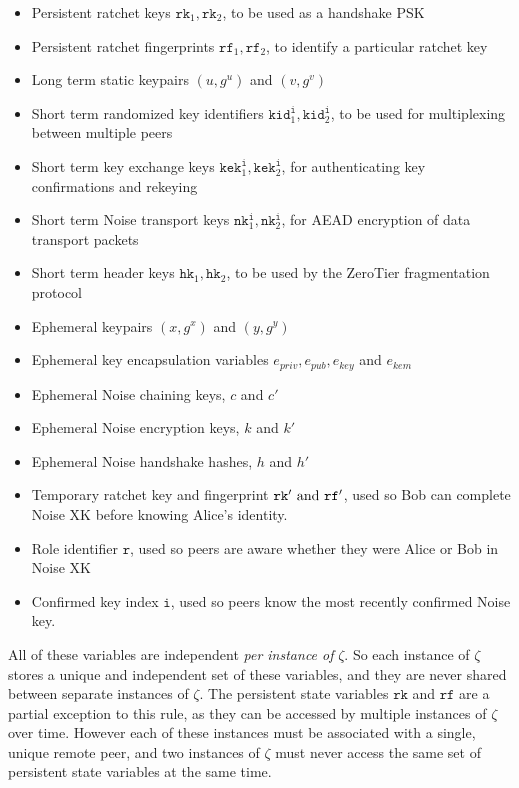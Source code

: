 \documentclass{article}
\begin{document}
\begin{itemize}
	\item Persistent ratchet keys $\texttt{rk}_1, \texttt{rk}_2$, to be used as a handshake PSK
	\item Persistent ratchet fingerprints $\texttt{rf}_1, \texttt{rf}_2$, to identify a particular ratchet key
	\item Long term static keypairs $(u, g^u)$ and $(v, g^v)$
	\item Short term randomized key identifiers $\texttt{kid}^\texttt{i}_1, \texttt{kid}^\texttt{i}_2$, to be used for multiplexing between multiple peers
	\item Short term key exchange keys $\texttt{kek}^\texttt{i}_1, \texttt{kek}^\texttt{i}_2$, for authenticating key confirmations and rekeying
	\item Short term Noise transport keys $\texttt{nk}^\texttt{i}_1, \texttt{nk}^\texttt{i}_2$, for AEAD encryption of data transport packets
	\item Short term header keys $\texttt{hk}_1, \texttt{hk}_2$, to be used by the ZeroTier fragmentation protocol
	\item Ephemeral keypairs $(x, g^x)$ and $(y, g^y)$
	\item Ephemeral key encapsulation variables $e_{priv}, e_{pub}, e_{key}$ and $e_{kem}$
	\item Ephemeral Noise chaining keys, $c$ and $c'$
	\item Ephemeral Noise encryption keys, $k$ and $k'$
	\item Ephemeral Noise handshake hashes, $h$ and $h'$
	\item Temporary ratchet key and fingerprint $\texttt{rk}'\text{ and } \texttt{rf}'$, used so Bob can complete Noise XK before knowing Alice's identity.
	\item Role identifier $\texttt{r}$, used so peers are aware whether they were Alice or Bob in Noise XK
	\item Confirmed key index $\texttt{i}$, used so peers know the most recently confirmed Noise key.
\end{itemize}

All of these variables are independent \emph{per instance of} $\zeta$. So each instance of $\zeta$ stores a unique and independent set of these variables, and they are never shared between separate instances of $\zeta$. The persistent state variables $\texttt{rk}$ and $\texttt{rf}$ are a partial exception to this rule, as they can be accessed by multiple instances of $\zeta$ over time. However each of these instances must be associated with a single, unique remote peer, and two instances of $\zeta$ must never access the same set of persistent state variables at the same time.
\end{document}
